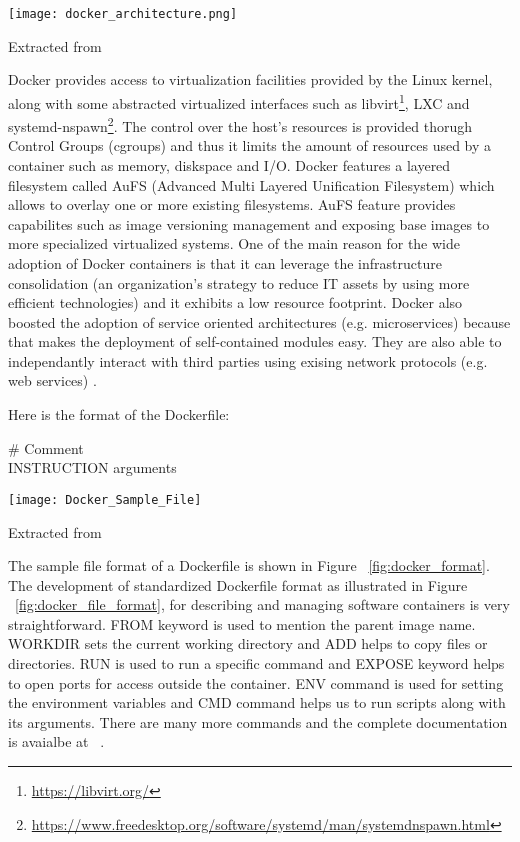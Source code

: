 \begin{center}
\texttt{[image: docker\_architecture.png]}
\label{fig:docker_architecture}
\caption*{Extracted from \cite{docker-documentation}}
\end{center}


Docker provides access to virtualization facilities provided by the Linux kernel, along with some abstracted virtualized interfaces such as libvirt\footnote{\url{https://libvirt.org/}}, LXC and systemd-nspawn\footnote{\url{https://www.freedesktop.org/software/systemd/man/systemdnspawn.html}}. The control over the host's resources is provided thorugh Control Groups (cgroups) and thus it limits the amount of resources used by a container such as memory, diskspace and I/O. Docker features a layered filesystem called AuFS (Advanced Multi Layered Unification Filesystem) which allows to overlay one or more existing filesystems. AuFS feature provides capabilites such as image versioning management and exposing base images to more specialized virtualized systems. One of the main reason for the wide adoption of Docker containers is that it can leverage the infrastructure consolidation (an organization's strategy to reduce IT assets by using more efficient technologies) and it exhibits a low resource footprint. Docker also boosted the adoption of service oriented architectures (e.g. microservices) because that makes the deployment of self-contained modules easy. They are also able to independantly interact with third parties using exising network protocols (e.g. web services) \cite{Xavier:2013:PEC:2497369.2497577}. 

Here is the format of the Dockerfile:

\begin{tcolorbox}[colback=black!5!white,colframe=black!75!black]
\# Comment \\
INSTRUCTION arguments
\end{tcolorbox}
\label{fig:docker_format}

\begin{center}
\texttt{[image: Docker\_Sample\_File]}
\label{fig:docker_file_format}
\caption*{Extracted from \cite{docker-file-format}}
\end{center}

The sample file format of a Dockerfile is shown in Figure ~\ref{fig:docker_format}. The development of standardized Dockerfile format as illustrated in Figure ~\ref{fig:docker_file_format}, for describing and managing software containers is very straightforward. FROM keyword is used to mention the parent image name. WORKDIR sets the current working directory and ADD helps to copy files or directories. RUN is used to run a specific command and EXPOSE keyword helps to open ports for access outside the container. ENV command is used for setting the environment variables and CMD command helps us to run scripts along with its arguments. There are many more commands and the complete documentation is avaialbe at ~\cite{docker_commands}. 

